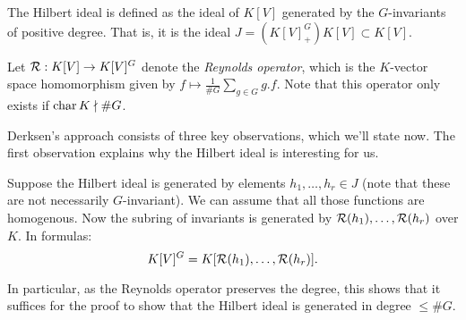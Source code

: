 \documentclass[../main.tex]{subfiles}
\begin{document}
\begin{defi}
    The Hilbert ideal is defined as the ideal of $K[V]$ generated by the 
    $G$-invariants of positive degree. That is, it is the ideal $J = (K[V]^G_+) K[V] 
    \subset K[V]$. 
\end{defi}
Let $\mathcal{R}: K[V] \to K[V]^G$ denote the \emph{Reynolds operator}, which is the
$K$-vector space homomorphism given by $f \mapsto \allowbreak \frac{1}{\# G}
\allowbreak \sum_{g \in G} g.f$. Note that this operator only exists if $\operatorname{char} K
\nmid \# G$.

Derksen's approach consists of three key observations, which we'll state now.
The first observation explains why the Hilbert ideal is interesting for us.
\begin{prop}\label{prop:obs1}
    Suppose the Hilbert ideal is generated by elements $h_1, \dots, h_r \in J$ 
    (note that these are not necessarily $G$-invariant).
    We can assume that all those functions are homogenous. Now the subring of invariants
    is generated by $\mathcal{R}(h_1), \dots, \mathcal{R}(h_r)$ over $K$. In formulas:
    \begin{equation*}
        K[V]^G = K[\mathcal{R}(h_1), \dots, \mathcal{R}(h_r)].
    \end{equation*}
\end{prop}
In particular, as the Reynolds operator preserves the degree, this shows that
it suffices for the proof to show that the Hilbert ideal is generated in degree
$\leq \#G$.
\end{document}
